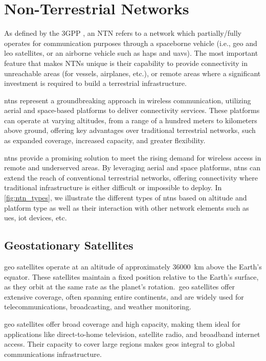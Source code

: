 \chapter{Non-Terrestrial Networks}\label{ch:non_terrestrial_networks}

As defined by the 3GPP \autocite{3gpp2018ntn}, an NTN refers to a network which partially/fully operates for communication purposes through a spaceborne vehicle (i.e., \gls{geo} and \gls{leo} satellites, or an airborne vehicle such as \glspl{hap} and \glspl{uav}). The most important feature that makes NTNs unique is their capability to provide connectivity in unreachable areas (for vessels, airplanes, etc.), or remote areas where a significant investment is required to build a terrestrial infrastructure.

\glspl{ntn} represent a groundbreaking approach in wireless communication, utilizing aerial and space-based platforms to deliver connectivity services. These platforms can operate at varying altitudes, from a range of a hundred meters to kilometers above ground, offering key advantages over traditional terrestrial networks, such as expanded coverage, increased capacity, and greater flexibility.

\glspl{ntn} provide a promising solution to meet the rising demand for wireless access in remote and underserved areas. By leveraging aerial and space platforms, \glspl{ntn} can extend the reach of conventional terrestrial networks, offering connectivity where traditional infrastructure is either difficult or impossible to deploy. In \cref{fig:ntn_types}, we illustrate the different types of \glspl{ntn} based on altitude and platform type as well as their interaction with other network elements such as \glspl{ue}, \gls{iot} devices, etc.

\section{Geostationary Satellites}

\gls{geo} satellites operate at an altitude of approximately \SI{36000}{\kilo\meter} above the Earth's equator. These satellites maintain a fixed position relative to the Earth’s surface, as they orbit at the same rate as the planet's rotation.\ \gls{geo} satellites offer extensive coverage, often spanning entire continents, and are widely used for telecommunications, broadcasting, and weather monitoring.

\gls{geo} satellites offer broad coverage and high capacity, making them ideal for applications like direct-to-home television, satellite radio, and broadband internet access. Their capacity to cover large regions makes \glspl{geo} integral to global communications infrastructure.


